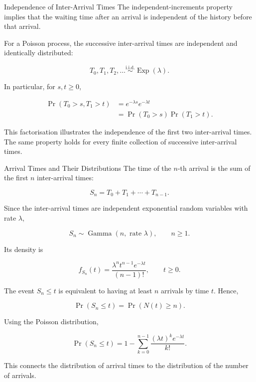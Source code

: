 \documentclass[
  ignorenonframetext,
  aspectratio=169,
]{beamer}
\begin{document}
\begin{frame}{Independence of Inter-Arrival Times}
\protect{}\label{independence-of-inter-arrival-times}
The independent-increments property implies that the waiting time after
an arrival is independent of the history before that arrival.

For a Poisson process, the successive inter-arrival times are
independent and identically distributed:

\[
T_0,T_1,T_2,\ldots
\overset{\text{i.i.d.}}{\sim}
\operatorname{Exp}(\lambda).
\]

In particular, for \(s,t\geq 0\),

\[
\begin{aligned}
\Pr(T_0>s,T_1>t)
&=e^{-\lambda s}e^{-\lambda t}\\
&=\Pr(T_0>s)\Pr(T_1>t).
\end{aligned}
\]

This factorisation illustrates the independence of the first two
inter-arrival times. The same property holds for every finite collection
of successive inter-arrival times.
\end{frame}

\begin{frame}{Arrival Times and Their Distributions}
\protect{}\label{arrival-times-and-their-distributions}
The time of the \(n\)-th arrival is the sum of the first \(n\)
inter-arrival times:

\[
S_n=T_0+T_1+\cdots+T_{n-1}.
\]

Since the inter-arrival times are independent exponential random
variables with rate \(\lambda\),

\[
S_n\sim\operatorname{Gamma}(n,\text{ rate }\lambda),
\qquad n\geq 1.
\]

Its density is

\[
f_{S_n}(t)
=\frac{\lambda^n t^{n-1}e^{-\lambda t}}{(n-1)!},
\qquad t\geq 0.
\]

The event \(S_n\leq t\) is equivalent to having at least \(n\) arrivals
by time \(t\). Hence,

\[
\Pr(S_n\leq t)=\Pr(N(t)\geq n).
\]

Using the Poisson distribution,

\[
\Pr(S_n\leq t)
=1-\sum_{k=0}^{n-1}
\frac{(\lambda t)^k e^{-\lambda t}}{k!}.
\]

This connects the distribution of arrival times to the distribution of
the number of arrivals.
\end{frame}
\end{document}
